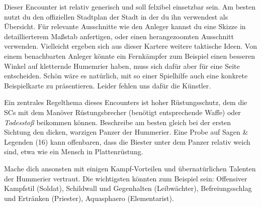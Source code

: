 Dieser Encounter ist relativ generisch und soll felxibel einsetzbar sein. Am besten nutzt du den offiziellen Stadtplan der Stadt in der du ihn verwendest als Übersicht. Für relevante Ausschnitte wie den Anleger kannst du eine Skizze in detaillierterem Maßstab anfertigen, oder einen herangezoomten Ausschnitt verwenden. Vielleicht ergeben sich aus dieser Kartere weitere taktische Ideen. Von einem benachbarten Anleger könnte ein Fernkämpfer zum Beispiel einen besseren Winkel auf kletternde Humemrier haben, muss sich dafür aber für eine Seite entscheiden. 
\newline
Schön wäre es natürlich, mit so einer Spielhilfe auch eine konkrete Beispielkarte zu präsentieren. Leider fehlen uns dafür die Künstler.

Ein zentrales Regelthema dieses Encounters ist hoher Rüstungsschutz, dem die SCs mit dem Manöver Rüstungsbrecher (benötigt entsprechende Waffe) oder \textit{Todesstoß} beikommen können. Beschreibe am besten gleich bei der ersten Sichtung den dicken, warzigen Panzer der Hummerier. Eine Probe auf Sagen \& Legenden (16) kann offenbaren, dass die Biester unter dem Panzer relativ weich sind, etwa wie ein Mensch in Plattenrüstung. 


Mache dich ansonsten mit einigen Kampf-Vorteilen und übernatürlichen Talenten der Hummerier vertraut. Die wichtigsten könnten zum Beispiel sein: Offensiver Kampfstil (Soldat), Schildwall und Gegenhalten (Leibwächter), Befreiungsschlag und Ertränken (Priester), Aquasphaero (Elementarist). 

